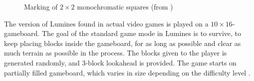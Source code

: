 \begin{figure}[H]
    \centering
    \caption{Marking of $2 \times 2$ monochromatic squares (from \cite{lumines})}
\end{figure}

The version of Lumines found in actual video games is played on a $10 \times 16$-gameboard. The goal of the standard game mode in Lumines is to survive, to keep placing blocks inside the gameboard, for as long as possible and clear as much terrain as possible in the process. The blocks given to the player is generated randomly, and 3-block lookahead is provided. The game starts on partially filled gameboard, which varies in size depending on the difficulty level \cite{lumines}.

